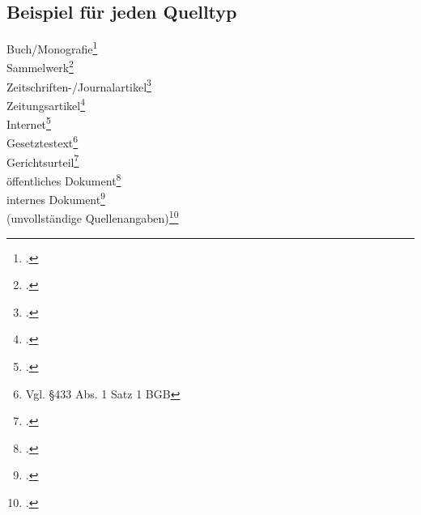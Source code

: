 \subsection{Beispiel für jeden Quelltyp}

Buch/Monografie\footcite[Vgl.][]{theisen2011}\\
Sammelwerk\footcite[Vgl.][]{maier2004}\\
Zeitschriften-/Journalartikel\footcite[Vgl.][]{chodorowreich2022loan}\\
Zeitungsartikel\footcite[Vgl.][]{dick2012neugierige}\\
Internet\footcite[Vgl.][]{capital2014}\\
Gesetztestext\footnote{Vgl. §433 Abs. 1 Satz 1 BGB}\\
Gerichtsurteil\footcite[Vgl.][]{bverfgh1968}\\
öffentliches Dokument\footcite[Vgl.][]{eu2022access}\\
internes Dokument\footcite[Vgl.][]{abcorganigramm}\\%
(unvollständige Quellenangaben)\footcite[Vgl.][]{blankmaier}\\